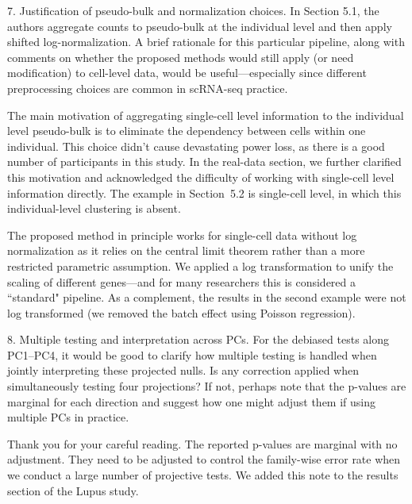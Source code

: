 \documentclass{article}
\theoremstyle{definition}
\begin{document}


\begin{shaded}
7. Justification of pseudo-bulk and normalization choices.
In Section 5.1, the authors aggregate counts to pseudo-bulk at the individual level and then apply shifted log-normalization. A brief rationale for this particular pipeline, along with comments on whether the proposed methods would still apply (or need modification) to cell-level data, would be useful—especially since different preprocessing choices are common in scRNA-seq practice.
\end{shaded}

The main motivation of aggregating single-cell level information to the individual level pseudo-bulk is to eliminate the dependency between cells within one individual. This choice didn't cause devastating power loss, as there is a good number of participants in this study. In the real-data section, we further clarified this motivation and acknowledged the difficulty of working with single-cell level information directly. The example in Section~5.2 is single-cell level, in which this individual-level clustering is absent. 

The proposed method in principle works for single-cell data without log normalization as it relies on the central limit theorem rather than a more restricted parametric assumption. We applied a log transformation to unify the scaling of different genes---and for many researchers this is considered a ``standard" pipeline. As a complement, the results in the second example were not log transformed (we removed the batch effect using Poisson regression).


\begin{shaded}
8. Multiple testing and interpretation across PCs.
For the debiased tests along PC1–PC4, it would be good to clarify how multiple testing is handled when jointly interpreting these projected nulls. Is any correction applied when simultaneously testing four projections? If not, perhaps note that the p-values are marginal for each direction and suggest how one might adjust them if using multiple PCs in practice.
\end{shaded}

Thank you for your careful reading. The reported p-values are marginal with no adjustment. They need to be adjusted to control the family-wise error rate when we conduct a large number of projective tests. We added this note to the results section of the Lupus study.
\end{document}
